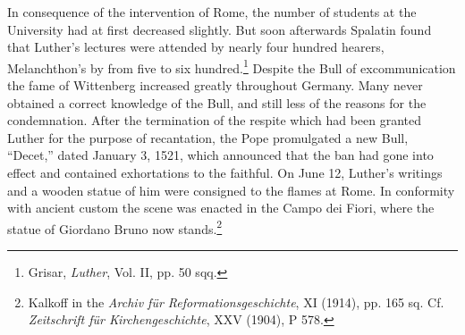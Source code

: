 In consequence of the intervention of Rome, the number of students at the
University had at first decreased slightly. But soon afterwards Spalatin
found that Luther’s lectures were attended by nearly
four hundred hearers, Melanchthon’s by from five to six hundred.\footnote{Grisar, \textit{Luther}, Vol. II, pp. 50 sqq.}
Despite the Bull of excommunication the fame of Wittenberg increased greatly
throughout Germany. Many never obtained a correct
knowledge of the Bull, and still less of the reasons for the condemnation.
After the termination of the respite which had been granted
Luther for the purpose of recantation, the Pope promulgated a new
Bull, “Decet,” dated January 3, 1521, which announced that the ban
had gone into effect and contained exhortations to the faithful. On
June 12, Luther’s writings and a wooden statue of him were consigned to
the flames at Rome. In conformity with ancient custom the
scene was enacted in the Campo dei Fiori, where the statue of Giordano
Bruno now stands.\footnote
{Kalkoff in the \textit{Archiv für Reformationsgeschichte}, XI (1914), pp. 165 sq. Cf. \textit{Zeitschrift
für Kirchengeschichte}, XXV (1904), P 578.}

